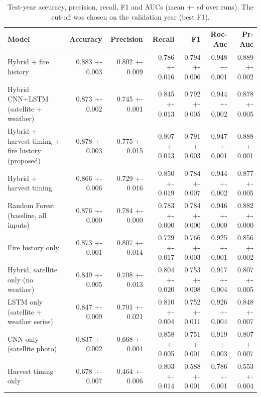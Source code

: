\begin{table}[t]
\centering
\caption{Test-year accuracy, precision, recall, F1 and AUCs (mean +- sd over runs). The cut-off was chosen on the validation year (best F1).}
\label{tab:table6_metrics}
\begin{tabular}{lrrrrrr}
\hline
Model & Accuracy & Precision & Recall & F1 & Roc-Auc & Pr-Auc \\
\hline
Hybrid + fire history & 0.883 +- 0.003 & 0.802 +- 0.009 & 0.786 +- 0.016 & 0.794 +- 0.006 & 0.948 +- 0.001 & 0.889 +- 0.002 \\
Hybrid CNN+LSTM (satellite + weather) & 0.873 +- 0.002 & 0.745 +- 0.001 & 0.845 +- 0.013 & 0.792 +- 0.005 & 0.944 +- 0.002 & 0.878 +- 0.005 \\
Hybrid + harvest timing + fire history (proposed) & 0.878 +- 0.003 & 0.775 +- 0.015 & 0.807 +- 0.013 & 0.791 +- 0.003 & 0.947 +- 0.001 & 0.888 +- 0.001 \\
Hybrid + harvest timing & 0.866 +- 0.006 & 0.729 +- 0.016 & 0.850 +- 0.019 & 0.784 +- 0.007 & 0.944 +- 0.002 & 0.877 +- 0.005 \\
Random Forest (baseline, all inputs) & 0.876 +- 0.000 & 0.784 +- 0.000 & 0.783 +- 0.000 & 0.784 +- 0.000 & 0.946 +- 0.000 & 0.882 +- 0.000 \\
Fire history only & 0.873 +- 0.001 & 0.807 +- 0.014 & 0.729 +- 0.017 & 0.766 +- 0.003 & 0.925 +- 0.001 & 0.856 +- 0.002 \\
Hybrid, satellite only (no weather) & 0.849 +- 0.005 & 0.708 +- 0.013 & 0.804 +- 0.020 & 0.753 +- 0.008 & 0.917 +- 0.004 & 0.807 +- 0.005 \\
LSTM only (satellite + weather series) & 0.847 +- 0.009 & 0.701 +- 0.021 & 0.810 +- 0.004 & 0.752 +- 0.011 & 0.926 +- 0.004 & 0.848 +- 0.007 \\
CNN only (satellite photo) & 0.837 +- 0.002 & 0.668 +- 0.004 & 0.858 +- 0.005 & 0.751 +- 0.001 & 0.919 +- 0.003 & 0.807 +- 0.007 \\
Harvest timing only & 0.678 +- 0.007 & 0.464 +- 0.006 & 0.803 +- 0.014 & 0.588 +- 0.001 & 0.786 +- 0.001 & 0.553 +- 0.004 \\
\hline
\end{tabular}
\end{table}
